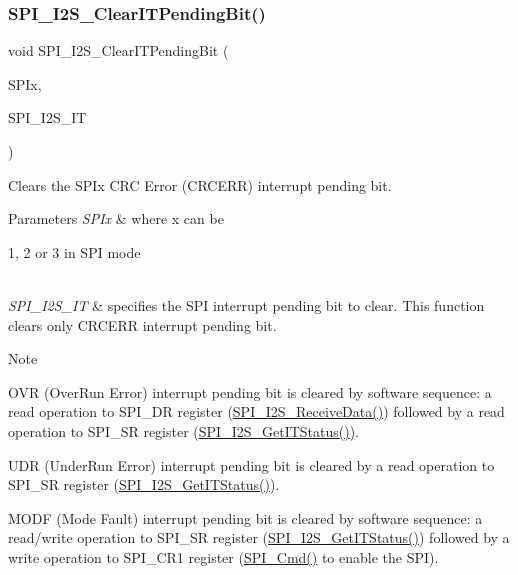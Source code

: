 \subsubsection{\texorpdfstring{SPI\_I2S\_ClearITPendingBit()}{SPI\_I2S\_ClearITPendingBit()}}
{\footnotesize\ttfamily void S\+P\+I\+\_\+\+I2\+S\+\_\+\+Clear\+I\+T\+Pending\+Bit (\begin{DoxyParamCaption}\item[{\mbox{\hyperlink{struct_s_p_i___type_def}{S\+P\+I\+\_\+\+Type\+Def}} $\ast$}]{S\+P\+Ix,  }\item[{uint8\+\_\+t}]{S\+P\+I\+\_\+\+I2\+S\+\_\+\+IT }\end{DoxyParamCaption})}



Clears the S\+P\+Ix C\+RC Error (C\+R\+C\+E\+RR) interrupt pending bit. 


\begin{DoxyParams}{Parameters}
{\em S\+P\+Ix} & where x can be
\begin{DoxyItemize}
\item 1, 2 or 3 in S\+PI mode 
\end{DoxyItemize}\\
\hline
{\em S\+P\+I\+\_\+\+I2\+S\+\_\+\+IT} & specifies the S\+PI interrupt pending bit to clear. This function clears only C\+R\+C\+E\+RR interrupt pending bit.\\
\hline
\end{DoxyParams}
\begin{DoxyNote}{Note}

\begin{DoxyItemize}
\item O\+VR (Over\+Run Error) interrupt pending bit is cleared by software sequence\+: a read operation to S\+P\+I\+\_\+\+DR register (\mbox{\hyperlink{group___s_p_i___private___functions_gab77de76547f3bff403236b263b070a30}{S\+P\+I\+\_\+\+I2\+S\+\_\+\+Receive\+Data()}}) followed by a read operation to S\+P\+I\+\_\+\+SR register (\mbox{\hyperlink{group___s_p_i___private___functions_ga72decbc1cd79f8fad92a2204beca6bc5}{S\+P\+I\+\_\+\+I2\+S\+\_\+\+Get\+I\+T\+Status()}}).
\item U\+DR (Under\+Run Error) interrupt pending bit is cleared by a read operation to S\+P\+I\+\_\+\+SR register (\mbox{\hyperlink{group___s_p_i___private___functions_ga72decbc1cd79f8fad92a2204beca6bc5}{S\+P\+I\+\_\+\+I2\+S\+\_\+\+Get\+I\+T\+Status()}}).
\item M\+O\+DF (Mode Fault) interrupt pending bit is cleared by software sequence\+: a read/write operation to S\+P\+I\+\_\+\+SR register (\mbox{\hyperlink{group___s_p_i___private___functions_ga72decbc1cd79f8fad92a2204beca6bc5}{S\+P\+I\+\_\+\+I2\+S\+\_\+\+Get\+I\+T\+Status()}}) followed by a write operation to S\+P\+I\+\_\+\+C\+R1 register (\mbox{\hyperlink{group___s_p_i___private___functions_gaa31357879a65ee1ed7223f3b9114dcf3}{S\+P\+I\+\_\+\+Cmd()}} to enable the S\+PI). 
\end{DoxyItemize}
\end{DoxyNote}


